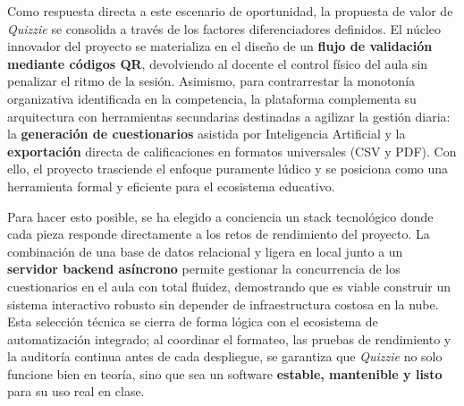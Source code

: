 Como respuesta directa a este escenario de oportunidad, la propuesta de valor de \textit{Quizzie} se consolida a través de los factores diferenciadores definidos. El núcleo innovador del proyecto se materializa en el diseño de un \textbf{flujo de validación mediante códigos QR}, devolviendo al docente el control físico del aula sin penalizar el ritmo de la sesión. Asimismo, para contrarrestar la monotonía organizativa identificada en la competencia, la plataforma complementa su arquitectura con herramientas secundarias destinadas a agilizar la gestión diaria: la \textbf{generación de cuestionarios} asistida por Inteligencia Artificial y la \textbf{exportación} directa de calificaciones en formatos universales (CSV y PDF). Con ello, el proyecto trasciende el enfoque puramente lúdico y se posiciona como una herramienta formal y eficiente para el ecosistema educativo.

Para hacer esto posible, se ha elegido a conciencia un stack tecnológico donde cada pieza responde directamente a los retos de rendimiento del proyecto. La combinación de una base de datos relacional y ligera en local junto a un \textbf{servidor backend asíncrono} permite gestionar la concurrencia de los cuestionarios en el aula con total fluidez, demostrando que es viable construir un sistema interactivo robusto sin depender de infraestructura costosa en la nube. Esta selección técnica se cierra de forma lógica con el ecosistema de automatización integrado; al coordinar el formateo, las pruebas de rendimiento y la auditoría continua antes de cada despliegue, se garantiza que \textit{Quizzie} no solo funcione bien en teoría, sino que sea un software \textbf{estable, mantenible y listo} para su uso real en clase.